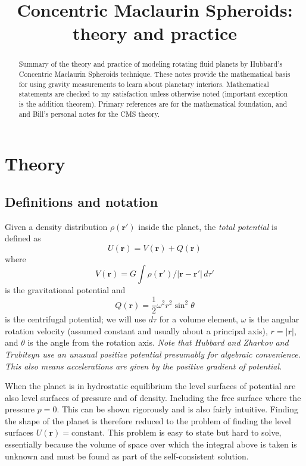 \documentclass[amsmath,amsfonts,rmp,letterpaper]{revtex4}
\newcommand{\V}[1]{\mathbf{#1}} %
\newcommand{\abs}[1]{\left\vert#1\right\vert} %
\newcommand{\arr}{\V{r}}
\newcommand{\arp}{\V{r'}}
\begin{document}
\title{Concentric Maclaurin Spheroids: theory and practice}%
\author{}
\begin{abstract}
Summary of the theory and practice of modeling rotating fluid planets by Hubbard's
Concentric Maclaurin Spheroids technique. These notes provide the mathematical
basis for using gravity measurements to learn about planetary interiors.
Mathematical statements are checked to my satisfaction unless otherwise noted
(important exception is the addition theorem). Primary references are
\citep{Zharkov1978} for the mathematical foundation, and
\citep{Hubbard2012,Hubbard2013} and Bill's personal notes for the CMS theory.
\end{abstract}
\maketitle
\tableofcontents

\section{Theory}

\subsection{Definitions and notation}\label{sec:definitions}
Given a density distribution $\rho(\arp)$ inside the planet, the \emph{total
potential} is defined as
\begin{equation}
U(\arr) = V(\arr) + Q(\arr)
\end{equation}
where
\begin{equation}\label{eq:gravpot}
V(\arr) = G\int{\rho(\arp)/\abs{\arr - \arp}\,d\tau'}
\end{equation}
is the gravitational potential and
\begin{equation}\label{eq:cetrifugal_potential}
Q(\arr) = \frac{1}{2}\omega^2r^2\sin^2\theta
\end{equation}
is the centrifugal potential; we will use $d\tau$ for a volume element, $\omega$
is the angular rotation velocity (assumed constant and usually about a principal
axis), $r=\abs{\arr}$, and $\theta$ is the angle from the rotation axis.
\emph{Note that Hubbard and Zharkov and Trubitsyn use an unusual positive
potential presumably for algebraic convenience. This also means accelerations are
given by the positive gradient of potential.}

When the planet is in hydrostatic equilibrium the level surfaces of potential are
also level surfaces of pressure and of density. Including the free surface where
the pressure $p=0$. This can be shown rigorously \citep[e.g.][]{Batchelor1967} and
is also fairly intuitive. Finding the shape of the planet is therefore reduced to
the problem of finding the level surfaces $U(\arr)=\text{constant}$. This problem
is easy to state but hard to solve, essentially because the volume of space over
which the integral above is taken is unknown and must be found as part of the
self-consistent solution.
\end{document}

